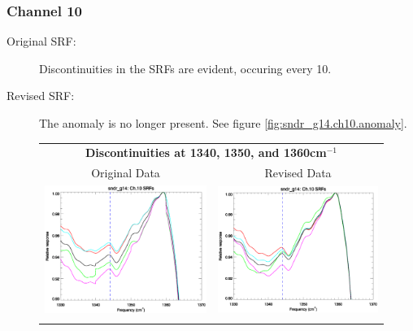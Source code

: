 \subsubsection{Channel 10}
\begin{description}
  \item[Original SRF:] Discontinuities in the SRFs are evident, occuring every 10\invcm.
  \item[Revised SRF:]  The anomaly is no longer present. See figure \ref{fig:sndr_g14.ch10.anomaly}.
\end{description}

\begin{figure}[htp]
  \centering
  \begin{tabular}{c c}
    \multicolumn{2}{c}{\textsf{\bfseries Discontinuities at 1340, 1350, and 1360cm$^{-1}$}} \\
    \hspace{1.5em}\textsf{Original Data} &
    \hspace{1.5em}\textsf{Revised Data} \\
    \includegraphics[scale=0.5,trim=0 40 0 0]{graphics/zoom_anomaly/original/sndr_g14.ch10.srf.eps} &
    \includegraphics[scale=0.5,trim=0 40 0 0]{graphics/zoom_anomaly/revised/sndr_g14.ch10.srf.eps} \\\\

\end{tabular}
\end{figure}
